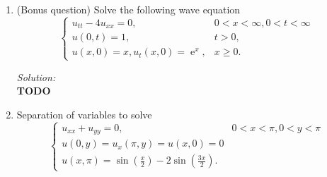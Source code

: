 \documentclass[10pt]{amsart}
\DeclareMathOperator{\E}{e}
\theoremstyle{nonumberplain}
\begin{document}
\begin{enumerate}[label={\bf {\arabic*}:}]
\newpage

\item (Bonus question) Solve the following wave equation
$$
\begin{cases}
u_{tt} - 4 u_{xx} = 0, & 0 < x < \infty, 0 < t < \infty \\
u(0, t) = 1, & t > 0, \\
u(x, 0) = x, u_t(x, 0) = \E^x, & x \geq 0.
\end{cases}
$$

\noindent
\textit{Solution:} \\
\textbf{TODO}

\newpage


\item Separation of variables to solve
$$
\begin{cases}
u_{xx} + u_{yy} = 0, & 0 < x < \pi, 0 < y < \pi \\
u(0, y) = u_x(\pi, y) = u(x, 0) = 0 \\
u(x, \pi) = \sin \left( \frac x 2 \right) - 2 \sin \left( \frac {3x}{2} \right).
\end{cases}
$$


\end{enumerate}
\end{document}
